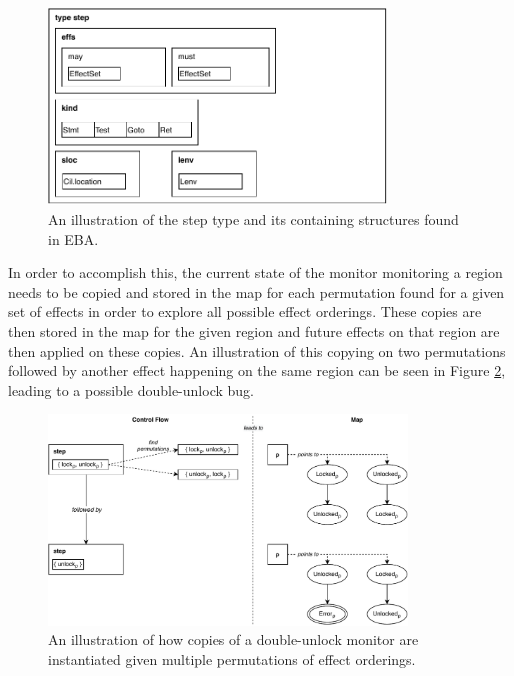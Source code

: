 \begin{figure}[H]
    \centering
    \includegraphics[width=0.8\textwidth]{implementation/figures/step}
    \caption{An illustration of the step type and its containing structures found in EBA.}
    \label{cfg-step}
\end{figure}

\noindent In order to accomplish this, the current state of the monitor monitoring a region needs to be copied and stored in the map for each permutation found for a given set of effects in order to explore all possible effect orderings. These copies are then stored in the map for the given region and future effects on that region are then applied on these copies. An illustration of this copying on two permutations followed by another effect happening on the same region can be seen in Figure \ref{permutation-copy}, leading to a possible double-unlock bug.

\begin{figure}[H]
    \centering
    \includegraphics[width=0.85\textwidth]{implementation/figures/permutation-copy}
    \caption{An illustration of how copies of a double-unlock monitor are instantiated given multiple permutations of effect orderings.}
    \label{permutation-copy}
\end{figure}

